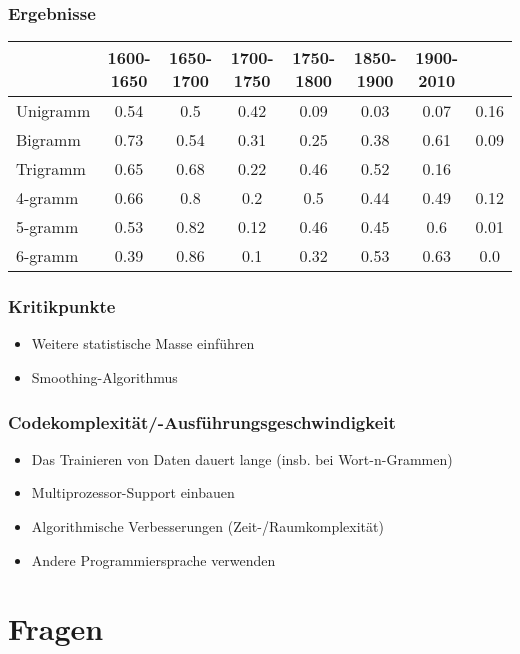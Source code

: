 \documentclass[t]{beamer} %
\begin{document}
\begin{frame}
  \frametitle{Ergebnisse}
  \begin{tabular}{l|ccccccc}
    & 1600-1650 & 1650-1700 & 1700-1750 & 1750-1800 & 1850-1900 &
    1900-2010 \\
    \hline
    Unigramm & 0.54 & 0.5 & 0.42 & 0.09 & 0.03 & 0.07 & 0.16 \\
    Bigramm & 0.73 & 0.54 & 0.31 & 0.25 & 0.38 & 0.61 & 0.09 \\
    Trigramm & 0.65 & 0.68 & 0.22 & 0.46 & 0.52 & 0.16 \\
    4-gramm & 0.66 & 0.8 & 0.2 & 0.5 & 0.44 & 0.49 & 0.12 \\
    5-gramm & 0.53 & 0.82 & 0.12 & 0.46 & 0.45 & 0.6 & 0.01 \\
    6-gramm & 0.39 & 0.86 & 0.1 & 0.32 & 0.53 & 0.63 & 0.0 \\
  \end{tabular}
\end{frame}

\begin{frame}
  \frametitle{Kritikpunkte}
  \begin{itemize}
  \item Weitere statistische Masse einführen\pause
  \item Smoothing-Algorithmus\pause
  \end{itemize}  
\end{frame}

\begin{frame}
  \frametitle{Codekomplexität/-Ausführungsgeschwindigkeit}
  \begin{itemize}
  \item Das Trainieren von Daten dauert lange (insb. bei Wort-n-Grammen)\pause
  \vspace*{1ex}
  \item Multiprozessor-Support einbauen\pause
  \item Algorithmische Verbesserungen (Zeit-/Raumkomplexität)\pause
  \item Andere Programmiersprache verwenden\pause
  \vspace*{1ex}
  \end{itemize}  
\end{frame}

\section{Fragen}
\end{document}
